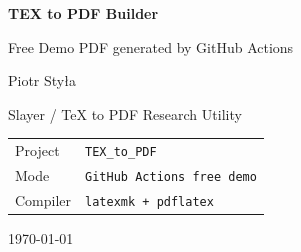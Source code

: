 
\begin{titlepage}
\centering

\vspace*{1.4cm}

{\Huge\bfseries TEX to PDF Builder\par}

\vspace{0.4cm}

{\Large Free Demo PDF generated by GitHub Actions\par}

\vspace{1.2cm}

{\large Piotr Styła\par}

\vspace{0.4cm}

{\large Slayer / TeX to PDF Research Utility\par}

\vspace{1.2cm}

\SlayerRule

\begin{center}
\begin{tabular}{ll}
\toprule
Project & \texttt{TEX\_to\_PDF} \\
Mode & \texttt{GitHub Actions free demo} \\
Compiler & \texttt{latexmk + pdflatex} \\
\bottomrule
\end{tabular}
\end{center}

\vfill

{\large \today\par}

\end{titlepage}
